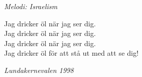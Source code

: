 {\footnotesize\textit{Melodi: Israelism}}\par
\vspace{10pt}
Jag dricker öl när jag ser dig.\\
Jag dricker öl när jag ser dig.\\
Jag dricker öl när jag ser dig.\\
Jag dricker öl för att stå ut med att se dig!\par
\vspace{10pt}
{\footnotesize\textit{Lundakernevalen 1998}}
